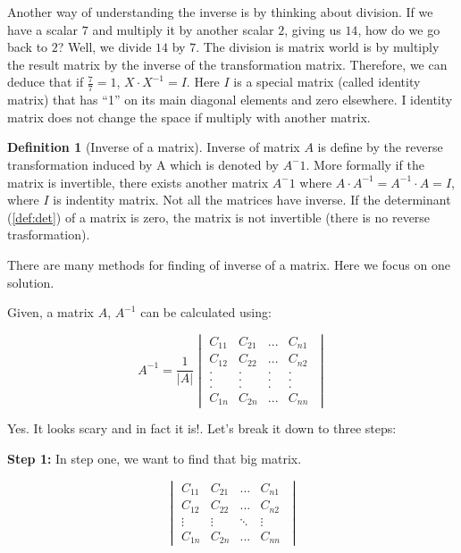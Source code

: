 \documentclass[
]{book}
\theoremstyle{definition}
\newtheorem{definition}{Definition}[chapter]
\theoremstyle{definition}
\theoremstyle{definition}
\theoremstyle{remark}
\begin{document}
Another way of understanding the inverse is by thinking about division. If we have a scalar \(7\) and multiply it by another scalar \(2\), giving us \(14\), how do we go back to \(2\)? Well, we divide \(14\) by \(7\). The division is matrix world is by multiply the result matrix by the inverse of the transformation matrix. Therefore, we can deduce that if \(\frac{7}{7}=1\), \(X\cdot X^{-1}=I\). Here \(I\) is a special matrix (called identity matrix) that has ``1'' on its main diagonal elements and zero elsewhere. I identity matrix does not change the space if multiply with another matrix.

\begin{definition}[Inverse of a matrix]
\protect\hypertarget{def:inv}{}{\label{def:inv} \iffalse (Inverse of a matrix) \fi{} }Inverse of matrix \(A\) is define by the reverse transformation induced by A which is denoted by \(A^-1\). More formally if the matrix is invertible, there exists another matrix \(A^-1\) where \(A \cdot A^{-1} =A^{-1} \cdot A=I\), where \(I\) is indentity matrix. Not all the matrices have inverse. If the determinant (\ref{def:det}) of a matrix is zero, the matrix is not invertible (there is no reverse trasformation).
\end{definition}

There are many methods for finding of inverse of a matrix. Here we focus on one solution.

Given, a matrix \(A\), \(A^{-1}\) can be calculated using:

\[A^{-1}=\frac{1}{|A|}\begin{vmatrix} C_{11} & C_{21} & ... & C_{n1}\\ C_{12} & C_{22} & ... & C_{n2}\\.&.&.&.\\.&.&.&.\\.&.&.&.\\C_{1n} & C_{2n} & ... & C_{nn}\
\end{vmatrix}\]

Yes. It looks scary and in fact it is!. Let's break it down to three steps:

\textbf{Step 1:}
In step one, we want to find that big matrix.

\[\begin{vmatrix} C_{11} & C_{21} & ... & C_{n1}\\ C_{12} & C_{22} & ... & C_{n2}\\\vdots &\vdots&\ddots& \vdots\\C_{1n} & C_{2n} & ... & C_{nn}\
\end{vmatrix}\]
\end{document}

